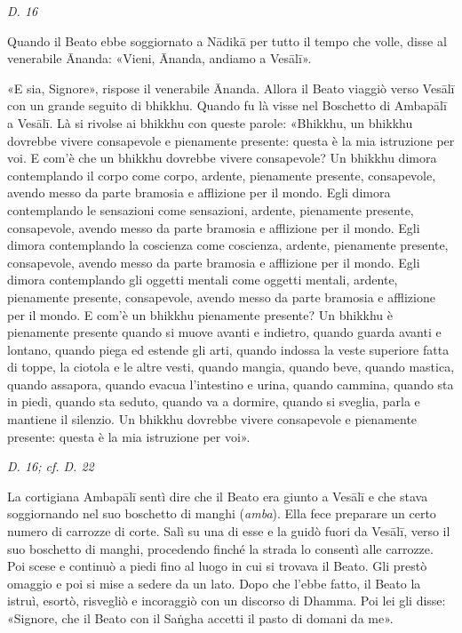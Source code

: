 \emph{D. 16}


Quando il Beato ebbe soggiornato a Nādikā per tutto il tempo che volle,
disse al venerabile Ānanda: «Vieni, Ānanda, andiamo a Vesālī».


«E sia, Signore», rispose il venerabile Ānanda. Allora il Beato viaggiò
verso Vesālī con un grande seguito di bhikkhu. Quando fu là visse nel
Boschetto di Ambapālī a Vesālī. Là si rivolse ai bhikkhu con queste
parole: «Bhikkhu, un bhikkhu dovrebbe vivere consapevole e pienamente
presente: questa è la mia istruzione per voi. E com’è che un bhikkhu
dovrebbe vivere consapevole? Un bhikkhu dimora contemplando il corpo
come corpo, ardente, pienamente presente, consapevole, avendo messo da
parte bramosia e afflizione per il mondo. Egli dimora contemplando le
sensazioni come sensazioni, ardente, pienamente presente, consapevole,
avendo messo da parte bramosia e afflizione per il mondo. Egli dimora
contemplando la coscienza come coscienza, ardente, pienamente presente,
consapevole, avendo messo da parte bramosia e afflizione per il mondo.
Egli dimora contemplando gli oggetti mentali come oggetti mentali,
ardente, pienamente presente, consapevole, avendo messo da parte
bramosia e afflizione per il mondo. E com’è un bhikkhu pienamente
presente? Un bhikkhu è pienamente presente quando si muove avanti e
indietro, quando guarda avanti e lontano, quando piega ed estende gli
arti, quando indossa la veste superiore fatta di toppe, la ciotola e le
altre vesti, quando mangia, quando beve, quando mastica, quando
assapora, quando evacua l’intestino e urina, quando cammina, quando sta
in piedi, quando sta seduto, quando va a dormire, quando si sveglia,
parla e mantiene il silenzio. Un bhikkhu dovrebbe vivere consapevole e
pienamente presente: questa è la mia istruzione per voi».


\emph{D. 16; cf. D. 22}


La cortigiana Ambapālī sentì dire che il Beato era giunto a Vesālī e che
stava soggiornando nel suo boschetto di manghi (\emph{amba}). Ella fece
preparare un certo numero di carrozze di corte. Salì su una di esse e la
guidò fuori da Vesālī, verso il suo boschetto di manghi, procedendo
finché la strada lo consentì alle carrozze. Poi scese e continuò a piedi
fino al luogo in cui si trovava il Beato. Gli prestò omaggio e poi si
mise a sedere da un lato. Dopo che l’ebbe fatto, il Beato la istruì,
esortò, risvegliò e incoraggiò con un discorso di Dhamma. Poi lei gli
disse: «Signore, che il Beato con il Saṅgha accetti il pasto di domani
da me».


